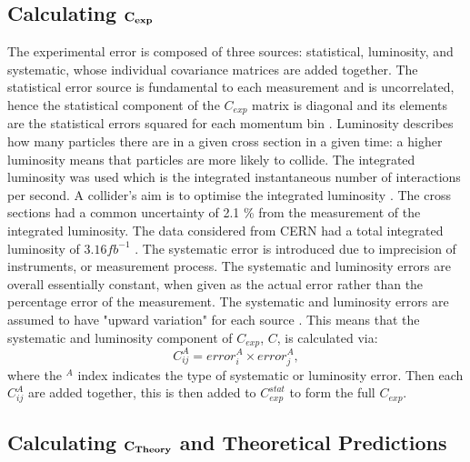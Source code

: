\documentclass[12pt, onecolumn, nofootinbib]{revtex4}    %
\begin{document}
\subsection{Calculating ${\bold{C_{exp}}}$}
The experimental error is composed of three sources: statistical, luminosity, and systematic, whose individual covariance matrices are added together. The statistical error source  is fundamental to each measurement and is uncorrelated, hence the statistical component of the ${C_{exp}}$ matrix is diagonal and its elements are the statistical errors squared for each momentum bin \cite{DMP}. Luminosity describes how many particles there are in a given cross section in a given time: a higher luminosity means that particles are more likely to collide. The integrated luminosity was used which is the integrated instantaneous number of interactions per second. A collider's aim is to optimise the integrated luminosity \cite{LUM}. The cross sections had a common uncertainty of 2.1 \% from the measurement of the integrated luminosity. The data considered from CERN had a total integrated luminosity of ${3.16   fb^{-1}}$ \cite{HEPP}. The systematic error is introduced due to imprecision of instruments, or measurement process. The systematic and luminosity errors are overall essentially constant, when given as the actual error rather than the percentage error of the measurement. The systematic and luminosity errors are assumed to have "upward variation" for each source \cite{HEPD}. This means that the systematic and luminosity component of  ${C_{exp}}$, ${C}$, is calculated via: \begin{equation} \label{Cov} C_{ij}^{A} =  error^{A}_{i} \times error^{A}_{j}, \end{equation} where the ${^A}$ index indicates the type of systematic or luminosity error. Then each ${C_{ij}^{A}}$ are added together, this is then added to ${C_{exp}^{stat}}$ to form the full ${C_{exp}}$.


\subsection{Calculating ${\bold{C_{Theory}}}$ and Theoretical Predictions}
\end{document}
